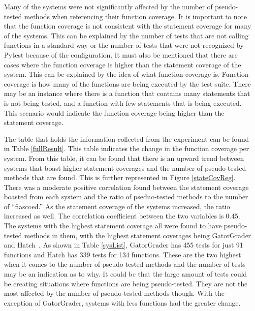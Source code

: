 


Many of the systems were not significantly affected by the number of pseudo-tested methods when referencing their function coverage. It is important to note that the function coverage is not consistent with the statement coverage for many of the systems. This can be explained by the number of tests that are not calling functions in a standard way or the number of tests that were not recognized by Pytest because of the configuration. It must also be mentioned that there are cases where the function coverage is higher than the statement coverage of the system. This can be explained by the idea of what function coverage is. Function coverage is how many of the functions are being executed by the test suite. There may be an instance where there is a function that contains many statements that is not being tested, and a function with few statements that is being executed. This scenario would indicate the function coverage being higher than the statement coverage.

The table that holds the information collected from the experiment can be found in Table \ref{fullResult}. This table indicates the change in the function coverage per system. From this table, it can be found that there is an upward trend between systems that boast higher statement coverages and the number of pseudo-tested methods that are found. This is further represented in Figure \ref{stateCovReg}. There was a moderate positive correlation found between the statement coverage boasted from each system and the ratio of pseduo-tested methods to the number of ``fiascoed.'' As the statement coverage of the systems increased, the ratio increased as well. The correlation coefficient between the two variables is 0.45. The systems with the highest statement coverage all were found to have pseudo-tested methods in them, with the highest statement coverages being GatorGrader and Hatch~\cite{Hat}. As shown in Table \ref{sysList}, GatorGrader has 455 tests for just 91 functions and Hatch has 339 tests for 134 functions. These are the two highest when it comes to the number of pseudo-tested methods and the number of tests may be an indication as to why. It could be that the large amount of tests could be creating situations where functions are being pseudo-tested. They are not the most affected by the number of pseudo-tested methods though. With the exception of GatorGrader, systems with less functions had the greater change.

